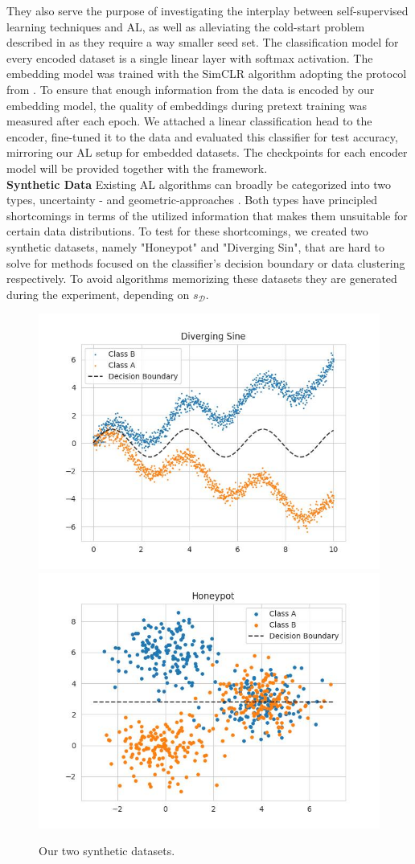 \documentclass[]{article}
\newcommand{\D}{\mathcal{D}}
\begin{document}
They also serve the purpose of investigating the interplay between self-supervised learning techniques and AL, as well as alleviating the cold-start problem described in \cite{luth2024navigating} as they require a way smaller seed set.
The classification model for every encoded dataset is a single linear layer with softmax activation.
The embedding model was trained with the SimCLR \cite{chen2020simple} algorithm adopting the protocol from \cite{hacohen2022active}. 
To ensure that enough information from the data is encoded by our embedding model, the quality of embeddings during pretext training was measured after each epoch.
We attached a linear classification head to the encoder, fine-tuned it to the data and evaluated this classifier for test accuracy, mirroring our AL setup for embedded datasets. 
The checkpoints for each encoder model will be provided together with the framework. \\ [1mm]
\textbf{Synthetic Data}
Existing AL algorithms can broadly be categorized into two types, uncertainty \cite{wang2014new, gal2017deep} - and geometric-approaches \cite{sener2017active, hacohen2022active, ashdeep}. 
Both types have principled shortcomings in terms of the utilized information that makes them unsuitable for certain data distributions.
To test for these shortcomings, we created two synthetic datasets, namely "Honeypot" and "Diverging Sin", that are hard to solve for methods focused on the classifier's decision boundary or data clustering respectively. 
To avoid algorithms memorizing these datasets they are generated during the experiment, depending on $s_\D$. \\ [1mm]
\begin{figure}[H]
	\centering
	\includegraphics[width=0.4\linewidth]{img/diverging_sin.jpg}
	\includegraphics[width=0.4\linewidth]{img/honeypot.jpg}
	\caption{Our two synthetic datasets.}
        \label{fig:synthDataAppendix}
\end{figure}
\end{document}
